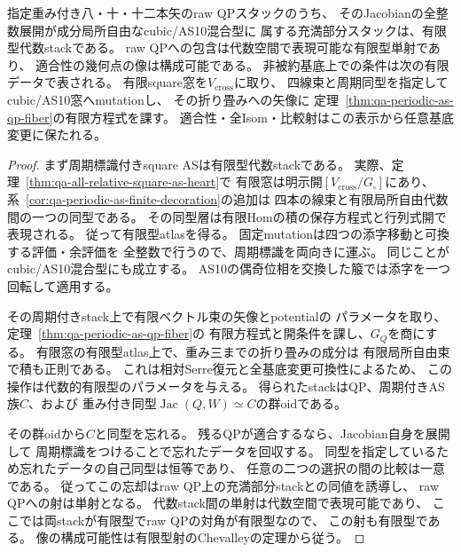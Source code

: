 \begin{theorem}
\label{thm:qa-raw-qp-as-finite-type}
指定重み付き八・十・十二本矢のraw QPスタックのうち、
そのJacobianの全整数展開が成分局所自由なcubic/AS10混合型に
属する充満部分スタックは、有限型代数stackである。
raw QPへの包含は代数空間で表現可能な有限型単射であり、
適合性の幾何点の像は構成可能である。
非被約基底上での条件は次の有限データで表される。
有限square窓を$V_{\mathrm{cross}}$に取り、
四線束と周期同型を指定してcubic/AS10窓へmutationし、
その折り畳みへの矢像に
定理~\ref{thm:qa-periodic-as-qp-fiber}の有限方程式を課す。
適合性・全Isom・比較射はこの表示から任意基底変更に保たれる。
\end{theorem}
\begin{proof}
まず周期標識付きsquare ASは有限型代数stackである。
実際、定理~\ref{thm:qa-all-relative-square-as-heart}で
有限窓は明示開$[V_{\mathrm{cross}}/G_\square]$にあり、
系~\ref{cor:qa-periodic-as-finite-decoration}の追加は
四本の線束と有限局所自由代数間の一つの同型である。
その同型層は有限Homの積の保存方程式と行列式開で表現される。
従って有限型atlasを得る。
固定mutationは四つの添字移動と可換する評価・余評価を
全整数で行うので、周期標識を両向きに運ぶ。
同じことがcubic/AS10混合型にも成立する。
AS10の偶奇位相を交換した箙では添字を一つ回転して適用する。

その周期付きstack上で有限ベクトル束の矢像とpotentialの
パラメータを取り、定理~\ref{thm:qa-periodic-as-qp-fiber}の
有限方程式と開条件を課し、$G_Q$を商にする。
有限窓の有限型atlas上で、重み三までの折り畳みの成分は
有限局所自由束で積も正則である。
これは相対Serre復元と全基底変更可換性によるため、
この操作は代数的有限型のパラメータを与える。
得られたstackはQP、周期付きAS族$C$、および
重み付き同型$\operatorname{Jac}(Q,W)\simeq C$の群oidである。

その群oidから$C$と同型を忘れる。
残るQPが適合するなら、Jacobian自身を展開して
周期標識をつけることで忘れたデータを回収する。
同型を指定しているため忘れたデータの自己同型は恒等であり、
任意の二つの選択の間の比較は一意である。
従ってこの忘却はraw QP上の充満部分stackとの同値を誘導し、
raw QPへの射は単射となる。
代数stack間の単射は代数空間で表現可能であり、
ここでは両stackが有限型でraw QPの対角が有限型なので、
この射も有限型である。
像の構成可能性は有限型射のChevalleyの定理から従う。
\end{proof}

